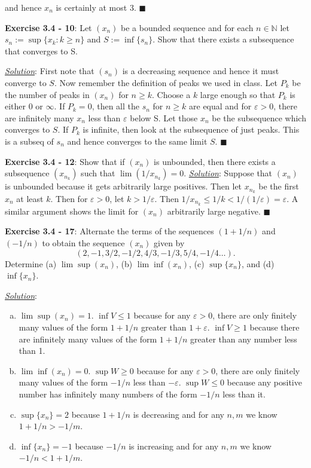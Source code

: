 \documentclass{article}
\begin{document}
and hence $x_n$ is certainly at most 3. \hfill $\blacksquare$

\hrulefill

\textbf{Exercise 3.4 - 10}: Let $(x_n)$ be a bounded sequence and for each
$n \in \mathbb{N}$ let $s_n := \sup \{ x_k : k \geq n \}$ and
$S := \inf \{ s_n \}$. Show that there exists a subsequence that converges
to S.

\underline{\textit{Solution}}: First note that $(s_n)$ is a decreasing
sequence and hence it must converge to $S$. Now remember the definition of
peaks we used in class. Let $P_k$ be the number of peaks in $(x_n)$ for
$n \geq k$. Choose a $k$ large enough so that $P_k$ is either 0 or
$\infty$. If $P_k = 0$, then all the $s_n$ for $n \geq k$ are equal and for
$\varepsilon>0$, there are infinitely many $x_n$ less than $\varepsilon$
below S. Let those $x_n$ be the subsequence which converges to $S$.
If $P_k$ is infinite, then look at the subsequence of just peaks. This is a
subseq of $s_n$ and hence converges to the same limit $S$.
\hfill $\blacksquare$

\hrulefill

\textbf{Exercise 3.4 - 12}:
Show that if $(x_n)$ is unbounded, then there exists a subsequence
$(x_{n_k})$ such that $\lim(1/x_{n_k})=0$.
\underline{\textit{Solution}}: Suppose that $(x_n)$ is unbounded because
it gets arbitrarily large positives. Then let $x_{n_k}$ be the first $x_n$
at least $k$. Then for $\varepsilon > 0$, let $k > 1/\varepsilon$. Then
$1/x_{n_k} \leq 1/k < 1/(1/\varepsilon) = \varepsilon$. A similar argument
shows the limit for $(x_n)$ arbitrarily large negative.
\hfill $\blacksquare$

\hrulefill

\textbf{Exercise 3.4 - 17}: Alternate the terms of the sequences $(1+1/n)$
and $(-1/n)$ to obtain the sequence $(x_n)$ given by
\[(2,-1,3/2,-1/2,4/3,-1/3,5/4,-1/4 \ldots).\]
Determine (a) $\lim \sup (x_n)$, (b) $\lim \inf (x_n)$,
(c) $\sup \{x_n\}$, and (d) $\inf \{x_n\}$.

\underline{\textit{Solution}}:
\begin{enumerate}[(a)]
  \item $\lim\sup(x_n) = 1$. $\inf V \leq 1$ because for any
    $\varepsilon > 0$, there are only finitely many values of the form
    $1+1/n$ greater than $1 + \varepsilon$. $\inf V \geq 1$ because
    there are infinitely many values of the form $1 + 1/n$ greater than
    any number less than 1.
  \item $\lim\inf(x_n) = 0$. $\sup W \geq 0$ because for any
    $\varepsilon > 0$, there are only finitely many values of the form
    $-1/n$ less than $-\varepsilon$. $\sup W \leq 0$ because any positive
    number has infinitely many numbers of the form $-1/n$ less than it.
  \item $\sup\{x_n\}=2$ because $1+1/n$ is decreasing and for any $n, m$ we
    know $1+1/n > -1/m$.
  \item $\inf\{x_n\}=-1$ because $-1/n$ is increasing and for any $n, m$ we
    know $-1/n < 1+1/m$.
\end{enumerate}
\end{document}
